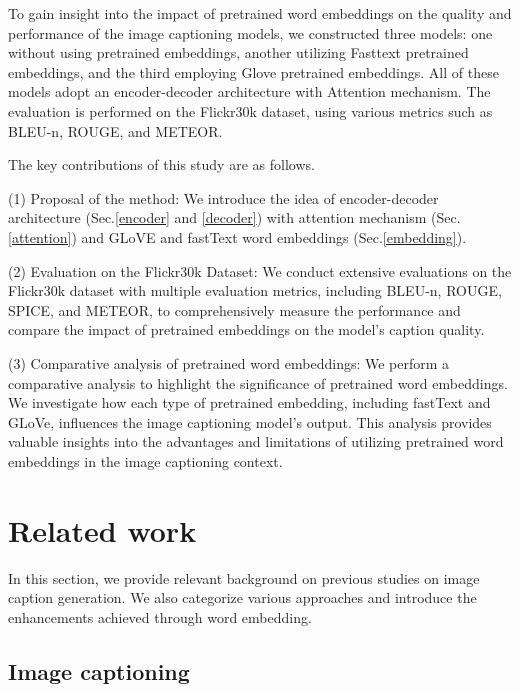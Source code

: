 \documentclass[conference]{IEEEtran}
\begin{document}
To gain insight into the impact of pretrained word embeddings on the quality and performance of the image captioning models, we constructed three models: one without using pretrained embeddings, another utilizing Fasttext pretrained embeddings, and the third employing Glove pretrained embeddings.  All of these models adopt an encoder-decoder architecture with Attention mechanism. The evaluation is performed on the Flickr30k dataset, using various metrics such as BLEU-n, ROUGE, and METEOR.


The key contributions of this study are as follows.


(1) Proposal of the method: We introduce the idea of encoder-decoder architecture (Sec.\ref{encoder} and \ref{decoder}) with attention mechanism (Sec.\ref{attention}) and GLoVE and fastText word embeddings (Sec.\ref{embedding}). 

(2) Evaluation on the Flickr30k Dataset: We conduct extensive evaluations on the Flickr30k dataset with multiple evaluation metrics, including BLEU-n, ROUGE, SPICE, and METEOR, to comprehensively measure the performance and compare the impact of pretrained embeddings on the model's caption quality.

(3) Comparative analysis of pretrained word embeddings: We perform a comparative analysis to highlight the significance of pretrained word embeddings. We investigate how each type of pretrained embedding, including fastText and GLoVe, influences the image captioning model's output. This analysis provides valuable insights into the advantages and limitations of utilizing pretrained word embeddings in the image captioning context.




\section{Related work}
In this section, we provide relevant background on previous studies on image caption generation. We also categorize various approaches and introduce the enhancements achieved through word embedding.


\subsection{Image captioning}
\end{document}
